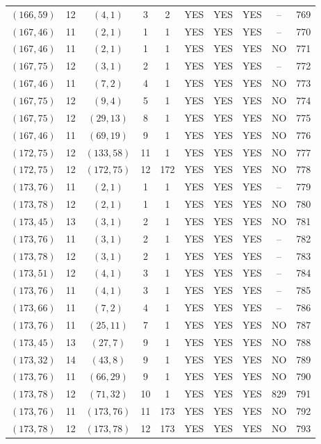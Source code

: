 \begin{longtable}{|c|c|c|c|c|c|c|c|c|c|}
$(166, 59)$ & 12 & $(4, 1)$ & 3 & 2 & YES & YES & YES & -- & 769\\
$(167, 46)$ & 11 & $(2, 1)$ & 1 & 1 & YES & YES & YES & -- & 770\\
$(167, 46)$ & 11 & $(2, 1)$ & 1 & 1 & YES & YES & YES & NO & 771\\
$(167, 75)$ & 12 & $(3, 1)$ & 2 & 1 & YES & YES & YES & -- & 772\\
$(167, 46)$ & 11 & $(7, 2)$ & 4 & 1 & YES & YES & YES & NO & 773\\
$(167, 75)$ & 12 & $(9, 4)$ & 5 & 1 & YES & YES & YES & NO & 774\\
$(167, 75)$ & 12 & $(29, 13)$ & 8 & 1 & YES & YES & YES & NO & 775\\
$(167, 46)$ & 11 & $(69, 19)$ & 9 & 1 & YES & YES & YES & NO & 776\\
$(172, 75)$ & 12 & $(133, 58)$ & 11 & 1 & YES & YES & YES & NO & 777\\
$(172, 75)$ & 12 & $(172, 75)$ & 12 & 172 & YES & YES & YES & NO & 778\\
$(173, 76)$ & 11 & $(2, 1)$ & 1 & 1 & YES & YES & YES & -- & 779\\
$(173, 78)$ & 12 & $(2, 1)$ & 1 & 1 & YES & YES & YES & NO & 780\\
$(173, 45)$ & 13 & $(3, 1)$ & 2 & 1 & YES & YES & YES & NO & 781\\
$(173, 76)$ & 11 & $(3, 1)$ & 2 & 1 & YES & YES & YES & -- & 782\\
$(173, 78)$ & 12 & $(3, 1)$ & 2 & 1 & YES & YES & YES & -- & 783\\
$(173, 51)$ & 12 & $(4, 1)$ & 3 & 1 & YES & YES & YES & -- & 784\\
$(173, 76)$ & 11 & $(4, 1)$ & 3 & 1 & YES & YES & YES & -- & 785\\
$(173, 66)$ & 11 & $(7, 2)$ & 4 & 1 & YES & YES & YES & -- & 786\\
$(173, 76)$ & 11 & $(25, 11)$ & 7 & 1 & YES & YES & YES & NO & 787\\
$(173, 45)$ & 13 & $(27, 7)$ & 9 & 1 & YES & YES & YES & NO & 788\\
$(173, 32)$ & 14 & $(43, 8)$ & 9 & 1 & YES & YES & YES & NO & 789\\
$(173, 76)$ & 11 & $(66, 29)$ & 9 & 1 & YES & YES & YES & NO & 790\\
$(173, 78)$ & 12 & $(71, 32)$ & 10 & 1 & YES & YES & YES & 829 & 791\\
$(173, 76)$ & 11 & $(173, 76)$ & 11 & 173 & YES & YES & YES & NO & 792\\
$(173, 78)$ & 12 & $(173, 78)$ & 12 & 173 & YES & YES & YES & NO & 793\\

\end{longtable}
